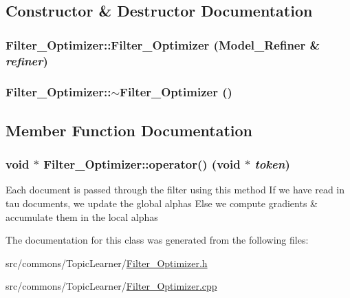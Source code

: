 \subsection{Constructor \& Destructor Documentation}
\hypertarget{class_filter___optimizer_a9f6909dd505e2ee8c2d7632a1b962113}{
\subsubsection[{Filter\_\-Optimizer}]{\setlength{\rightskip}{0pt plus 5cm}Filter\_\-Optimizer::Filter\_\-Optimizer ({\bf Model\_\-Refiner} \& {\em refiner})}}
\label{class_filter___optimizer_a9f6909dd505e2ee8c2d7632a1b962113}
\hypertarget{class_filter___optimizer_a098cadb780d0b2576e62641885d5750e}{
\subsubsection[{$\sim$Filter\_\-Optimizer}]{\setlength{\rightskip}{0pt plus 5cm}Filter\_\-Optimizer::$\sim$Filter\_\-Optimizer ()}}
\label{class_filter___optimizer_a098cadb780d0b2576e62641885d5750e}


\subsection{Member Function Documentation}
\hypertarget{class_filter___optimizer_a3f515565820d3486c8671affd6e519ec}{
\subsubsection[{operator()}]{\setlength{\rightskip}{0pt plus 5cm}void $\ast$ Filter\_\-Optimizer::operator() (void $\ast$ {\em token})}}
\label{class_filter___optimizer_a3f515565820d3486c8671affd6e519ec}
Each document is passed through the filter using this method If we have read in tau documents, we update the global alphas Else we compute gradients \& accumulate them in the local alphas 

The documentation for this class was generated from the following files:\begin{DoxyCompactItemize}
\item 
src/commons/TopicLearner/\hyperlink{_filter___optimizer_8h}{Filter\_\-Optimizer.h}\item 
src/commons/TopicLearner/\hyperlink{_filter___optimizer_8cpp}{Filter\_\-Optimizer.cpp}\end{DoxyCompactItemize}
